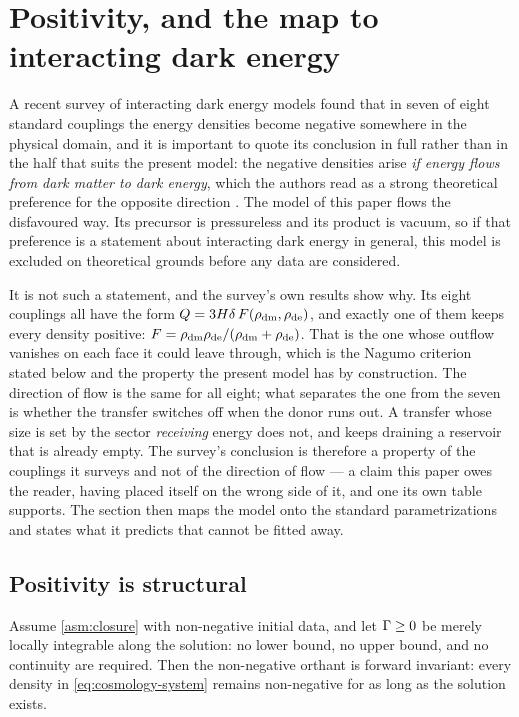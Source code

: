 \section{Positivity, and the map to interacting dark energy}
\label{sec:positivity-ide}

A recent survey of interacting dark energy models found that in seven of eight
standard couplings the energy densities become negative somewhere in the
physical domain, and it is important to quote its conclusion in full rather
than in the half that suits the present model: the negative densities arise
\emph{if energy flows from dark matter to dark energy}, which the authors read
as a strong theoretical preference for the opposite direction
\parencite{westhuizen2025_250904495,westhuizen2025_250904494,westhuizen2025_250904496}.
The model of this paper flows the disfavoured way. Its precursor is
pressureless and its product is vacuum, so if that preference is a statement
about interacting dark energy in general, this model is excluded on theoretical
grounds before any data are considered.

It is not such a statement, and the survey's own results show why. Its eight
couplings all have the form $Q=3H\delta\,F(\rho_{\rm dm},\rho_{\rm de})$, and
exactly one of them keeps every density positive: $F=\rho_{\rm dm}\rho_{\rm
de}/(\rho_{\rm dm}+\rho_{\rm de})$. That is the one whose outflow vanishes on
each face it could leave through, which is the Nagumo criterion stated below
and the property the present model has by construction. The direction of flow
is the same for all eight; what separates the one from the seven is whether
the transfer switches off when the donor runs out. A transfer whose size is
set by the sector \emph{receiving} energy does not, and keeps draining a
reservoir that is already empty. The survey's conclusion is therefore a
property of the couplings it surveys and not of the direction of flow --- a
claim this paper owes the reader, having placed itself on the wrong side of
it, and one its own table supports. The section then maps the model onto the standard
parametrizations and states what it predicts that cannot be fitted away.

\subsection{Positivity is structural}\label{sec:positivity-structural}

\begin{theorem}\label{thm:quasi-positivity}
  Assume \cref{asm:closure} with non-negative initial data, and let $\Gamma\ge0$
  be merely locally integrable along the solution: no lower bound, no upper
  bound, and no continuity are required. Then the non-negative orthant is
  forward invariant: every density in \cref{eq:cosmology-system} remains
  non-negative for as long as the solution exists.
\end{theorem}

